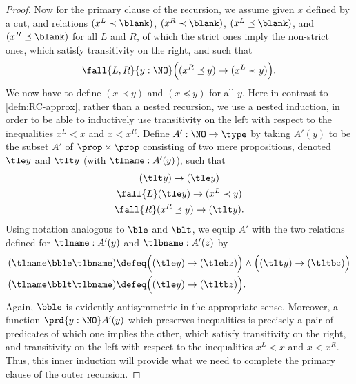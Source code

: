 \begin{proof}
  Now for the primary clause of the recursion, we assume given $x$ defined by a cut, and relations $(x^L \prec \blank)$, $(x^R \prec \blank)$, $(x^L \preceq \blank)$, and $(x^R \preceq \blank)$ for all $L$ and $R$, of which the strict ones imply the non-strict ones, which satisfy transitivity on the right, and such that
  \begin{equation}\label{eq:NO-prec-outer-IH}
    \fall{L,R}{y:\NO}\Big( (x^R\preceq y) \to (x^L \prec y) \Big).
  \end{equation}
  We now have to define $(x\prec y)$ and $(x\preceq y)$ for all $y$.
  Here in contrast to \cref{defn:RC-approx}, rather than a nested recursion, we use a nested induction, in order to be able to inductively use transitivity on the left with respect to the inequalities $x^L<x$ and $x<x^R$.
  Define $A':\NO\to\type$ by taking $A'(y)$ to be the subset $A'$ of $\prop\times\prop$ consisting of two mere propositions, denoted $\tle y$ and $\tlt y$ (with $\tlname:A'(y)$), such that
  \begin{gather}
    (\tlt y) \to (\tle y)\\
    \fall{L} (\tle y)\to (x^L\prec y) \label{eq:NO-prec-IHL}\\
    \fall{R} (x^R \preceq y) \to (\tlt y) \label{eq:NO-prec-IHR}.
  \end{gather}
  Using notation analogous to $\ble$ and $\blt$, we equip $A'$ with the two relations defined for $\tlname:A'(y)$ and $\tlbname:A'(z)$ by
  \begin{align*}
    (\tlname \bble \tlbname) &\defeq
    \Big((\tle y) \to (\tleb z)\Big) \land \Big((\tlt y) \to (\tltb z)\Big)\\
    (\tlname \bblt \tlbname) &\defeq
    \Big((\tle y) \to (\tltb z)\Big). %
  \end{align*}
  Again, $\bble$ is evidently antisymmetric in the appropriate sense.
  Moreover, a function $\prd{y:\NO} A'(y)$ which preserves inequalities is precisely a pair of predicates of which one implies the other, which satisfy transitivity on the right, and transitivity on the left with respect to the inequalities $x^L<x$ and $x<x^R$.
  Thus, this inner induction will provide what we need to complete the primary clause of the outer recursion.


\end{proof}
